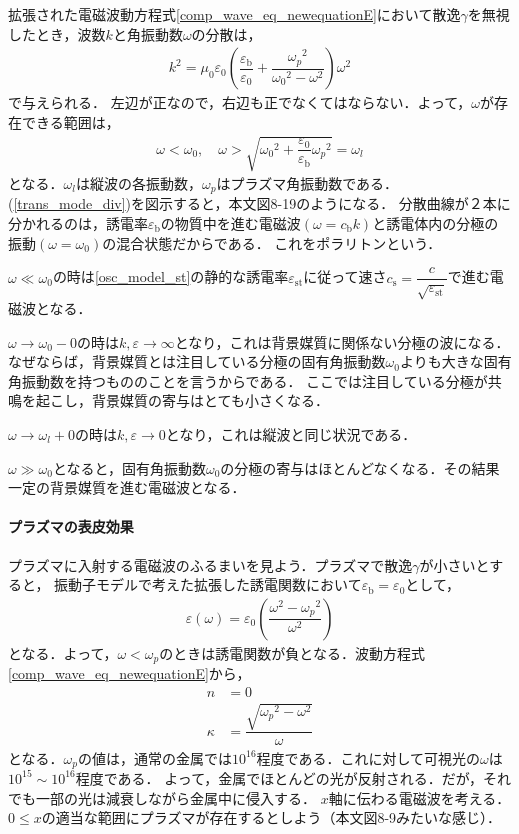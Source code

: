 拡張された電磁波動方程式\eqref{comp_wave_eq_newequationE}において散逸$\gamma$を無視したとき，波数$k$と角振動数$\omega$の分散は，
\begin{align}
  k^2=\mu_0\varepsilon_0\left(\dfrac{\varepsilon_{\text{b}}}{\varepsilon_0}+\dfrac{{\omega_p}^2}{{\omega_0}^2-\omega^2}\right)\omega^2\label{trans_mode_div}
\end{align}
で与えられる．
左辺が正なので，右辺も正でなくてはならない．よって，$\omega$が存在できる範囲は，
\begin{align}
  \omega < \omega_0 , \quad  \omega > \sqrt{{\omega_0}^2+\dfrac{\varepsilon_0}{\varepsilon_{\text{b}}}{\omega_p}^2} = \omega_l
\end{align}
となる．$\omega_l$は縦波の各振動数，$\omega_p$はプラズマ角振動数である．
(\ref{trans_mode_div})を図示すると，本文図8-19のようになる．
分散曲線が２本に分かれるのは，誘電率$\varepsilon_{\text{b}}$の物質中を進む電磁波$(\omega=c_{\text{b}}k)$と誘電体内の分極の振動$(\omega=\omega_0)$の混合状態だからである．
これをポラリトンという．

$\omega\ll\omega_0$の時は\eqref{osc_model_st}の静的な誘電率$\varepsilon_{\text{st}}$に従って速さ$c_{\text{s}}=\dfrac{c}{\sqrt{\varepsilon_{\text{st}}}}$で進む電磁波となる．

$\omega\to\omega_0-0$の時は$k,\varepsilon\to\infty$となり，これは背景媒質に関係ない分極の波になる．
なぜならば，背景媒質とは注目している分極の固有角振動数$\omega_0$よりも大きな固有角振動数を持つもののことを言うからである．
ここでは注目している分極が共鳴を起こし，背景媒質の寄与はとても小さくなる．

$\omega\to\omega_l+0$の時は$k,\varepsilon\to0$となり，これは縦波と同じ状況である．

$\omega\gg\omega_0$となると，固有角振動数$\omega_0$の分極の寄与はほとんどなくなる．その結果一定の背景媒質を進む電磁波となる．

\paragraph{プラズマの表皮効果}
プラズマに入射する電磁波のふるまいを見よう．プラズマで散逸$\gamma$が小さいとすると， 振動子モデルで考えた拡張した誘電関数において$\varepsilon_{\text{b}}=\varepsilon_0$として，
\begin{align}
  \varepsilon(\omega)=\varepsilon_0\left(\dfrac{\omega^2-{\omega_p}^2}{\omega^2}\right)
\end{align}
となる．よって，$\omega < \omega_p$のときは誘電関数が負となる．波動方程式\eqref{comp_wave_eq_newequationE}から，
\begin{align}
  n&=0\label{skin_eff_n}\\
  \kappa&=\dfrac{\sqrt{{{\omega_p}^2-\omega^2}}}{\omega}\label{skin_eff_kappa}
\end{align}
となる．$\omega_p$の値は，通常の金属では$10^{16}$程度である．これに対して可視光の$\omega$は$10^{15}\sim10^{16}$程度である．
よって，金属でほとんどの光が反射される．だが，それでも一部の光は減衰しながら金属中に侵入する．
$x$軸に伝わる電磁波を考える．$0\leq{x}$の適当な範囲にプラズマが存在するとしよう（本文図8-9みたいな感じ）．


